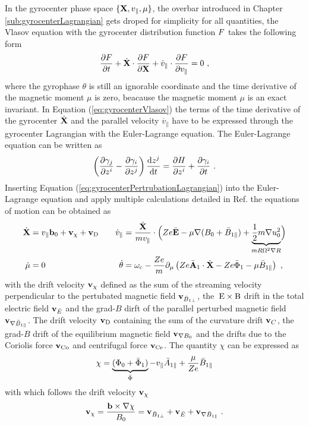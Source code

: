 In the gyrocenter phase space $\{\boldsymbol{\mathbf{X}}, v_\parallel, \mu\}$, the overbar introduced in Chapter \ref{sub:gyrocenterLagrangian} gets droped for simplicity for all quantities, the Vlasov equation with the gyrocenter distribution function $F$ takes the following form
\begin{gather}
	\frac{\partial F}{\partial t} + \dot{\boldsymbol{\mathbf{X}}} \cdot \frac{\partial F}{\partial \boldsymbol{\mathbf{X}}} + \dot{v}_\parallel \cdot \frac{\partial F}{\partial v_\parallel} = 0~,
	\label{eq:gyrocenterVlasov}
\end{gather}
where the gyrophase $\theta$ is still an ignorable coordinate and the time derivative of the magnetic moment $\mu$ is zero, beacause the magnetic moment $\mu$ is an exact invariant. In Equation (\ref{eq:gyrocenterVlasov}) the terms of the time derivative of the gyrocenter $\dot{\boldsymbol{\mathbf{X}}}$ and the parallel velocity $\dot{v_\parallel}$ have to be expressed through the gyrocenter Lagrangian with the Euler-Lagrange equation. The Euler-Lagrange equation can be written as 
\begin{gather}
	\left(\frac{\partial \gamma_j}{\partial z^i} - \frac{\partial \gamma_i}{\partial z^j}\right) \frac{\mathrm{d}z^j}{\mathrm{d}t} = \frac{\partial H}{\partial z^i} + \frac{\partial \gamma_i}{\partial t}~.
	\label{eq:eulerLagrange}
\end{gather}
Inserting Equation (\ref{eq:gyrocenterPertrubationLagrangian}) into the Euler-Lagrange equation and apply multiple calculations detailed in Ref.  the equations of motion can be obtained as
\begin{gather}
	\begin{aligned}
		\dot{\boldsymbol{\mathbf{X}}} &= v_\parallel\boldsymbol{\mathbf{b}}_0 + \boldsymbol{\mathbf{v}}_\chi + \boldsymbol{\mathbf{v}}_\mathrm{D} &\quad \dot{v}_\parallel &= \frac{\dot{\boldsymbol{\mathbf{X}}}}{mv_\parallel} \cdot \Bigl( Ze \bar{\boldsymbol{\mathbf{E}}} -\mu\nabla (B_0 + \bar{B}_{1\parallel}) + \underbrace{\frac{1}{2} m \nabla u_0^2}_{mR \Omega^2 \nabla R} \Bigr) \\
		\dot{\mu} &= 0  &\quad \dot{\theta} &= \omega_\mathrm{c} - \frac{Ze}{m} \partial_\mu \left(Ze\bar{\boldsymbol{\mathbf{A}}}_1 \cdot \dot{\boldsymbol{\mathbf{X}}} - Ze\bar{\Phi}_1 - \mu\bar{B}_{1\parallel}\right)~,
	\end{aligned}
	\label{eq:motionEquation}
\end{gather}
with the drift velocity $\boldsymbol{\mathbf{v}}_\chi$ defined as the sum of the streaming velocity perpendicular to the pertubated magnetic field $\boldsymbol{\mathbf{v}}_{\bar{B}_{1\perp}}$, the $\mathrm{\:E}\times\mathrm{B}$ drift in the total electric field $\boldsymbol{\mathbf{v}}_{\bar{E}}$ and the grad-$B$ dirft of the parallel perturbed magnetic field $\boldsymbol{\mathbf{v}}_{\nabla \bar{B}_{1\parallel}}$. The drift velocity $\boldsymbol{\mathbf{v}}_\mathrm{D}$ containing the sum of the curvature drift $\boldsymbol{\mathbf{v}}_C$, the grad-$B$ drift of the equilibrium magnetic field $\boldsymbol{\mathbf{v}}_{\nabla B_0}$ and the drifts due to the Coriolis force $\boldsymbol{\mathbf{v}}_\mathrm{Co}$ and centrifugal force $\boldsymbol{\mathbf{v}}_\mathrm{Ce}$. The quantity $\chi$ can be expressed as
\begin{gather}
	\chi = \underbrace{(\Phi_0 + \bar{\Phi}_1)}_{\bar{\Phi}} - v_\parallel \bar{A}_{1\parallel} + \frac{\mu}{Ze} \bar{B}_{1\parallel}
	\label{eq:driftPotential}
\end{gather}
with which follows the drift velocity $\boldsymbol{\mathbf{v}}_\chi$ 
\begin{gather}
	\boldsymbol{\mathbf{v}}_\chi = \frac{\boldsymbol{\mathbf{b}} \times \nabla \chi}{B_0} = \boldsymbol{\mathbf{v}}_{\bar{B}_{1\perp}} + \boldsymbol{\mathbf{v}}_{\bar{E}} + \boldsymbol{\mathbf{v}}_{\nabla \bar{B}_{1\parallel}}~.
	\label{eq:veloDriftPotential}
\end{gather}
\bigskip

